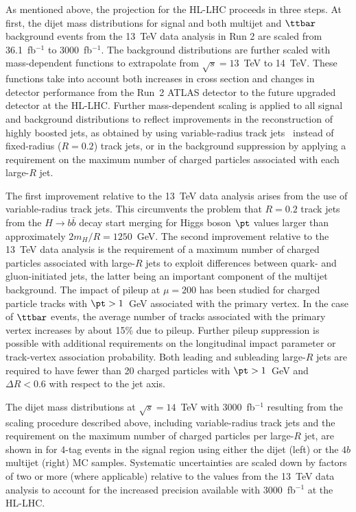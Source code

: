 As mentioned above, the projection for the HL-LHC proceeds in three steps. At first,  the dijet mass distributions for signal and both multijet and $\ttbar$ background events from the 13~TeV data analysis in Run 2 are scaled from 36.1~fb$^{-1}$ to 3000~fb$^{-1}$. The background distributions are further scaled with mass-dependent functions to extrapolate from $\sqrt{s} = 13$~TeV to 14~TeV. These functions take into account both increases in cross section and changes in detector performance from the Run~2 ATLAS detector to the future upgraded detector at the HL-LHC. Further mass-dependent scaling is applied to all signal and background distributions to reflect improvements in the reconstruction of highly boosted jets, as obtained by using 
variable-radius track jets~\cite{ATL-PHYS-PUB-2016-013} instead of fixed-radius ($R=0.2$) track jets, or in the background suppression by applying a requirement on
the maximum number of charged particles associated with each large-$R$ jet. 

The first improvement relative to the 13~TeV data analysis arises from the use of variable-radius
track jets. This circumvents the problem that $R=0.2$ track jets from the
$H \to b\bar{b}$ decay start merging for Higgs boson $\pt$ values larger than
approximately $2 m_H/R = 1250$~GeV.
The second improvement relative to the 13~TeV data analysis is the requirement of a maximum
number of charged particles associated with large-$R$ jets to exploit differences between
quark- and gluon-initiated jets, the latter being an important component of the multijet
background. The impact of pileup at $\mu=200$ has been studied for charged particle tracks with $\pt > 1$~GeV
associated with the primary vertex.
In the case of $\ttbar$ events, the average number of tracks associated with the primary vertex
increases by about 15\% due to pileup. Further pileup
suppression is possible with additional requirements on the longitudinal impact parameter or
track-vertex association probability. 
Both leading and subleading large-$R$ jets are required to have fewer than 20 charged particles with $\pt > 1$~GeV
and $\Delta R < 0.6$ with respect to the jet axis.

The dijet mass distributions at $\sqrt{s} = 14$~TeV with 3000~fb$^{-1}$ resulting from
the scaling procedure described above, including variable-radius track jets and
the requirement on the maximum number of charged particles per large-$R$ jet, are shown in 
 for 4-tag events in the signal region 
using either the dijet (left) or the $4b$ multijet (right) MC samples.
Systematic uncertainties are scaled down by factors of two or more (where applicable)
relative to the values from the 13~TeV data analysis to account for the increased precision available
with 3000~fb$^{-1}$ at the HL-LHC.

